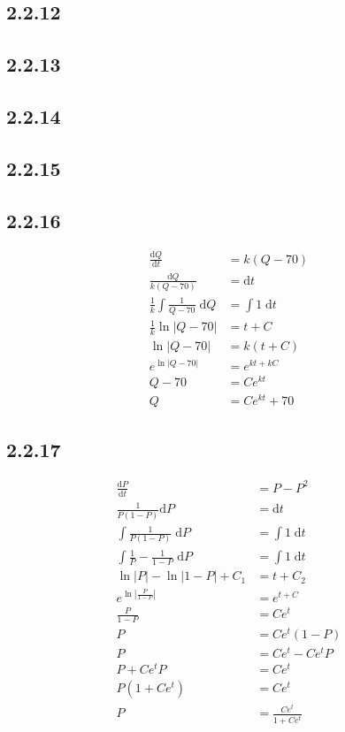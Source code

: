 \documentclass{article}
\begin{document}
\subsection{2.2.12}

\subsection{2.2.13}

\subsection{2.2.14}

\subsection{2.2.15}

\subsection{2.2.16}
\begin{align*}
    \frac{\mathrm{d}Q}{\mathrm{d}t} &= k(Q-70) \\
    \frac{\mathrm{d}Q}{k(Q-70)} &= \mathrm{d}t \\
    \frac{1}{k}\int \frac{1}{Q-70} \; \mathrm{d}Q &= \int 1 \; \mathrm{d}t\\
    \frac{1}{k}\ln|Q-70|  &=  t+C \\
    \ln|Q-70| &= k(t+C)\\
    e^{\ln|Q-70| }  &= e^{kt+kC}\\
    Q-70  &= Ce^{kt}\\
    Q &= Ce^{kt}+70 
\end{align*}

\subsection{2.2.17}
\begin{align*}
    \frac{\mathrm{d}P}{\mathrm{d}t} &= P-P^2 \\
    \frac{1}{P(1-P)}\mathrm{d}P &= \mathrm{d}t \\
    \int \frac{1}{P(1-P)} \; \mathrm{d}P &= \int 1 \; \mathrm{d}t   \\
    \int \frac{1}{P}-\frac{1}{1-P} \; \mathrm{d}P &= \int 1 \; \mathrm{d}t \\
    \ln |P| - \ln |1-P| + C_1  &=  t +C_2 \\
    e^{\ln|\frac{P}{1-P}| } &= e^{t+C} \\
    \frac{P}{1-P} &= Ce^{t}\\
    P &= Ce^{t}(1-P) \\
    P &= Ce^{t}-Ce^{t}P \\
    P+Ce^{t}P &= Ce^{t}\\
    P(1+Ce^{t}) &= Ce^{t} \\
    P &= \frac{Ce^{t}}{1+Ce^{t}}
\end{align*}
\end{document}
